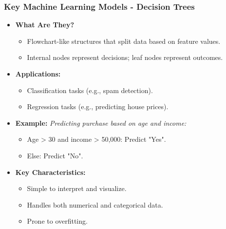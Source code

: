 \documentclass[aspectratio=169]{beamer}
\begin{document}
\begin{frame}[fragile]
    \frametitle{Key Machine Learning Models - Decision Trees}
    \begin{itemize}
        \item \textbf{What Are They?}
            \begin{itemize}
                \item Flowchart-like structures that split data based on feature values.
                \item Internal nodes represent decisions; leaf nodes represent outcomes.
            \end{itemize}
        \item \textbf{Applications:}
            \begin{itemize}
                \item Classification tasks (e.g., spam detection).
                \item Regression tasks (e.g., predicting house prices).
            \end{itemize}
        \item \textbf{Example:}
		\textit{Predicting purchase based on age and income:}
            \begin{itemize}
                \item Age > 30 and income > 50,000: Predict "Yes".
                \item Else: Predict "No".
            \end{itemize}
        \item \textbf{Key Characteristics:}
            \begin{itemize}
                \item Simple to interpret and visualize.
                \item Handles both numerical and categorical data.
                \item Prone to overfitting.
            \end{itemize}
    \end{itemize}
\end{frame}
\end{document}
